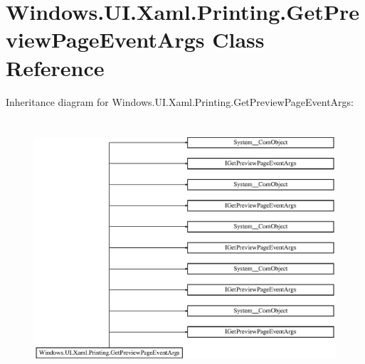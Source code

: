 \hypertarget{class_windows_1_1_u_i_1_1_xaml_1_1_printing_1_1_get_preview_page_event_args}{}\section{Windows.\+U\+I.\+Xaml.\+Printing.\+Get\+Preview\+Page\+Event\+Args Class Reference}
\label{class_windows_1_1_u_i_1_1_xaml_1_1_printing_1_1_get_preview_page_event_args}
Inheritance diagram for Windows.\+U\+I.\+Xaml.\+Printing.\+Get\+Preview\+Page\+Event\+Args\+:\begin{figure}[H]
\begin{center}
\leavevmode
\includegraphics[height=9.595016cm]{class_windows_1_1_u_i_1_1_xaml_1_1_printing_1_1_get_preview_page_event_args}
\end{center}
\end{figure}
